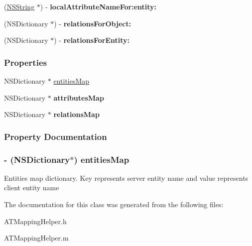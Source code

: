 \begin{DoxyCompactItemize}
\item 
\hypertarget{interface_a_t_mapping_helper_a6096407dd2fee1da8af9a7dfc3256219}{
(\hyperlink{class_n_s_string}{NSString} $\ast$) -\/ {\bfseries localAttributeNameFor:entity:}}
\label{interface_a_t_mapping_helper_a6096407dd2fee1da8af9a7dfc3256219}

\item 
\hypertarget{interface_a_t_mapping_helper_af0532a90720b80d8c68f569cbef709c2}{
(NSDictionary $\ast$) -\/ {\bfseries relationsForObject:}}
\label{interface_a_t_mapping_helper_af0532a90720b80d8c68f569cbef709c2}

\item 
\hypertarget{interface_a_t_mapping_helper_aebeeba57781626e2ce67e7cdc695ba41}{
(NSDictionary $\ast$) -\/ {\bfseries relationsForEntity:}}
\label{interface_a_t_mapping_helper_aebeeba57781626e2ce67e7cdc695ba41}

\end{DoxyCompactItemize}
\subsubsection*{Properties}
\begin{DoxyCompactItemize}
\item 
NSDictionary $\ast$ \hyperlink{interface_a_t_mapping_helper_af42b5b8a8f037917548813611383da0f}{entitiesMap}
\item 
\hypertarget{interface_a_t_mapping_helper_abd9d756b7b5ed7a788ffcd9d1c8acc5c}{
NSDictionary $\ast$ {\bfseries attributesMap}}
\label{interface_a_t_mapping_helper_abd9d756b7b5ed7a788ffcd9d1c8acc5c}

\item 
\hypertarget{interface_a_t_mapping_helper_a9545ea64a1c4a6564aba6d30155fd47f}{
NSDictionary $\ast$ {\bfseries relationsMap}}
\label{interface_a_t_mapping_helper_a9545ea64a1c4a6564aba6d30155fd47f}

\end{DoxyCompactItemize}


\subsubsection{Property Documentation}
\hypertarget{interface_a_t_mapping_helper_af42b5b8a8f037917548813611383da0f}{
\subsubsection[{entitiesMap}]{\setlength{\rightskip}{0pt plus 5cm}-\/ (NSDictionary$\ast$) entitiesMap}}
\label{interface_a_t_mapping_helper_af42b5b8a8f037917548813611383da0f}
Entities map dictionary. Key represents server entity name and value represents client entity name 

The documentation for this class was generated from the following files:\begin{DoxyCompactItemize}
\item 
ATMappingHelper.h\item 
ATMappingHelper.m\end{DoxyCompactItemize}
